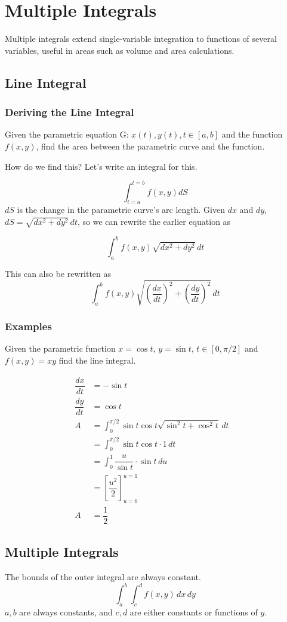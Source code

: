 \chapter{Multiple Integrals}
Multiple integrals extend single-variable integration to functions of several variables, useful in areas such as volume and area calculations.
\section{Line Integral}

\subsection{Deriving the Line Integral}
Given the parametric equation G: \(x(t), y(t), t \in [a, b]\) and the function \(f(x,y)\), find the area between the parametric curve and the function.

How do we find this? Let's write an integral for this.

\[
    \int_{t=a}^{t=b} f(x,y) dS 
\]
$dS$ is the change in the parametric curve's arc length. Given $dx$ and $dy$, \(dS = \sqrt{dx^2 + dy^2}\, dt\), so we can rewrite the earlier equation as
  
\[
    \int_{a}^{b} f(x, y) \sqrt{dx^2+dy^2}\, dt
\]

This can also be rewritten as 
\[
    \int_a^b f(x,y) \sqrt{\left(\dfrac{dx}{dt}\right)^2+\left(\dfrac{dy}{dt}\right)^2}\, dt
\]
\pagebreak
\subsection{Examples}
Given the parametric function $x = \cos{t}, \, y = \sin{t}, \,  t \in [0, \pi/2]$ and $f(x,y) = xy$ find the line integral.


\begin{align*}
    \dfrac{dx}{dt} &= -\sin{t}\qquad\qquad&\\
    \dfrac{dy}{dt} &= \cos{t}\\
    A &= \int_{0}^{\pi/2} \sin{t}\cos{t} \sqrt{\sin^2{t}+\cos^2{t}}\, dt\\
    &= \int_{0}^{\pi/2}  \sin{t}\cos{t} \cdot 1 \,dt\\
    &= \int_{0}^{1} \dfrac{u}{\sin{t}} \cdot {\sin{t}}\, du\\
    &= \left[\dfrac{u^2}{2}\right]_{u=0}^{u=1}\\
    A &= \dfrac{1}{2}
\end{align*}

\section{Multiple Integrals}
The bounds of the outer integral are always constant.
\[
    \int_{a}^{b}\int_{c}^{d} f(x,y) \,dx\,dy
\]
$a, b$ are always constants, and $c, d$ are either constants or functions of $y$.